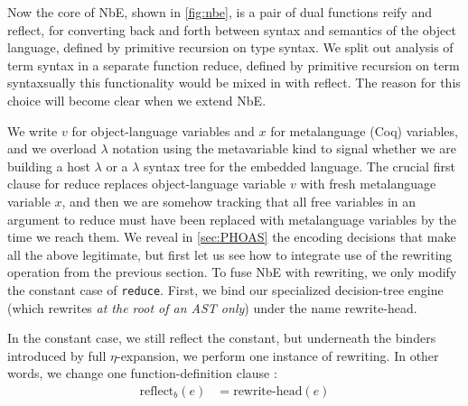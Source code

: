\documentclass[sn-mathphys,pdflatex]{sn-jnl}%
\newcommand{\defeq}{=}
\theoremstyle{thmstyleone}%
\theoremstyle{thmstyletwo}%
\theoremstyle{thmstylethree}%
\begin{document}
Now the core of NbE, shown in \autoref{fig:nbe}, is a pair of dual functions reify and reflect, for converting back and forth between syntax and semantics of the object language, defined by primitive recursion on type syntax.
We split out analysis of term syntax in a separate function reduce, defined by primitive recursion on term syntaxsually this functionality would be mixed in with reflect.
The reason for this choice will become clear when we extend NbE.

We write $v$ for object-language variables and $x$ for metalanguage (Coq) variables, and we overload $\lambda$ notation using the metavariable kind to signal whether we are building a host $\lambda$ or a $\lambda$ syntax tree for the embedded language.
The crucial first clause for reduce replaces object-language variable $v$ with fresh metalanguage variable $x$, and then we are somehow tracking that all free variables in an argument to reduce must have been replaced with metalanguage variables by the time we reach them.
We reveal in \autoref{sec:PHOAS} the encoding decisions that make all the above legitimate, but first let us see how to integrate use of the rewriting operation from the previous section.
To fuse NbE with rewriting, we only modify the constant case of \texttt{reduce}.
First, we bind our specialized decision-tree engine (which rewrites \emph{at the root of an AST only}) under the name rewrite-head.

In the constant case, we still reflect the constant, but underneath the binders introduced by full $\eta$-expansion, we perform one instance of rewriting.
In other words,  we change  one function-definition clause :
\begin{align*}
  \text{reflect}_{b}(e) & \defeq \text{rewrite-head}(e)
\end{align*}
\end{document}
